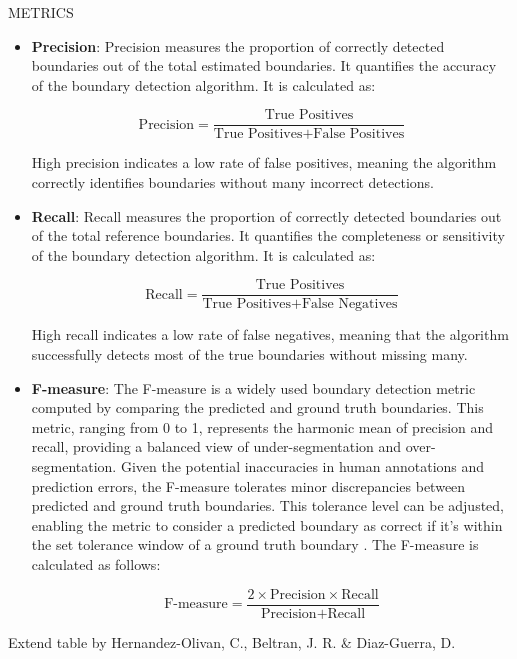 
METRICS

\begin{itemize}
    \item \textbf{Precision}: Precision measures the proportion of correctly detected boundaries out of the total estimated boundaries. It quantifies the accuracy of the boundary detection algorithm. It is calculated as:
    
    \[
    \text{Precision} = \frac{\text{True Positives}}{\text{True Positives} + \text{False Positives}}
    \]
    
    High precision indicates a low rate of false positives, meaning the algorithm correctly identifies boundaries without many incorrect detections.
    
    \item \textbf{Recall}: Recall measures the proportion of correctly detected boundaries out of the total reference boundaries. It quantifies the completeness or sensitivity of the boundary detection algorithm. It is calculated as:
    
    \[
    \text{Recall} = \frac{\text{True Positives}}{\text{True Positives} + \text{False Negatives}}
    \]
    
    High recall indicates a low rate of false negatives, meaning that the algorithm successfully detects most of the true boundaries without missing many.
    
    \item \textbf{F-measure}: The F-measure is a widely used boundary detection metric computed by comparing the predicted and ground truth boundaries. This metric, ranging from 0 to 1, represents the harmonic mean of precision and recall, providing a balanced view of under-segmentation and over-segmentation. Given the potential inaccuracies in human annotations and prediction errors, the F-measure tolerates minor discrepancies between predicted and ground truth boundaries. This tolerance level can be adjusted, enabling the metric to consider a predicted boundary as correct if it's within the set tolerance window of a ground truth boundary \cite{Turnbull2007ABOOSTING}. The F-measure is calculated as follows:
    
    \[
    \text{F-measure} = \frac{2 \times \text{Precision} \times \text{Recall}}{\text{Precision} + \text{Recall}}
    \]
\end{itemize}

Extend table by Hernandez-Olivan, C., Beltran, J. R. \& Diaz-Guerra, D. 
\cite{Hernandez-Olivan2021MusicFeatures}


